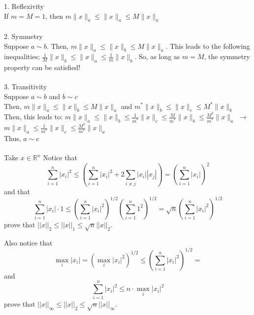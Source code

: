 \documentclass[letterpaper,12pt]{article}
\theoremstyle{definition}
\begin{document}
\begin{spacing}{1.3}{}
	1. Reflexivity\\
	If $m = M = 1$, then $m \|x\|_{a} \leq \|x\|_{a} \leq M \|x\|_{a}$ \\\\
	2. Symmetry \\
	Suppose $a \sim b$. Then, $m \|x\|_{a} \leq \|x\|_{b} \leq M \|x\|_{a}$. This leads to the following inequalities; $\frac{1}{M} \|x\|_{b} \leq \|x\|_{a} \leq \frac{1}{m} \|x\|_{b}$. So, as long as $m=M$, the symmetry property can be satisfied! \\\\
	3. Transitivity \\
	Suppose $a \sim b$ and $b \sim c$ \\
	Then, $m \|x\|_{a} \leq \|x\|_{b} \leq M \|x\|_{a}$ and $m^* \|x\|_{b} \leq \|x\|_{c} \leq M^* \|x\|_{b}$ \\
	Then, this leads to: $m \|x\|_{a} \leq \|x\|_{b} \leq \frac{1}{m^*} \|x\|_{c} \leq \frac{M}{m^*} \|x\|_b \leq \frac{M^2}{m^*} \|x\|_a$ $\rightarrow$ $m \|x\|_{a} \leq \frac{1}{m^*}\|x\|_{c} \leq \frac{M^2}{m^*} \|x\|_{a}$ \\
	Thus, $a \sim c$ \\\\
	
	
	Take $x\in\mathbb R^n$
	Notice that
	\begin{equation*}
	\sum_{i=1}^n|x_i|^2\leq
	\left(\sum_{i=1}^n|x_i|^2+2\sum_{i\neq j}|x_i||x_j|\right)=
	\left(\sum_{i=1}^n|x_i|\right)^2
	\end{equation*}
	and that
	\begin{equation*}
	\sum_{i=1}^n|x_i|\cdot1\leq
	\left(\sum_{i=1}^n|x_i|^2\right)^{1/2}\left(\sum_{i=1}^n1^2\right)^{1/2}=
	\sqrt{n}\left(\sum_{i=1}^n|x_i|^2\right)^{1/2}
	\end{equation*}
	prove that $||x||_2\leq||x||_1\leq\sqrt{n}||x||_2$.
	
	Also notice that
	\begin{equation*}
	\max_{i}|x_i|=\left(\max_i|x_i|^2\right)^{1/2}\leq
	\left(\sum_{i=1}^n|x_i|^2\right)^{1/2}=
	\end{equation*}
	and
	\begin{equation*}
	\sum_{i=1}^n|x_i|^2\leq n\cdot\max_i|x_i|^2
	\end{equation*}
	prove that $||x||_\infty\leq||x||_2\leq \sqrt{n}||x||_\infty$. \\\\
	
	\setlength{\leftskip}{10pt}
	

\end{spacing}
\end{document}

